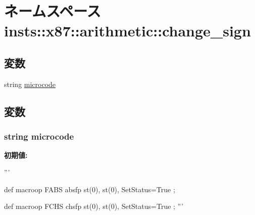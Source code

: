 \hypertarget{namespaceinsts_1_1x87_1_1arithmetic_1_1change__sign}{
\section{ネームスペース insts::x87::arithmetic::change\_\-sign}
\label{namespaceinsts_1_1x87_1_1arithmetic_1_1change__sign}
}
\subsection*{変数}
\begin{DoxyCompactItemize}
\item 
string \hyperlink{namespaceinsts_1_1x87_1_1arithmetic_1_1change__sign_a770f11a173e99389a8802f0107ed8f52}{microcode}
\end{DoxyCompactItemize}


\subsection{変数}
\hypertarget{namespaceinsts_1_1x87_1_1arithmetic_1_1change__sign_a770f11a173e99389a8802f0107ed8f52}{
\subsubsection[{microcode}]{\setlength{\rightskip}{0pt plus 5cm}string {\bf microcode}}}
\label{namespaceinsts_1_1x87_1_1arithmetic_1_1change__sign_a770f11a173e99389a8802f0107ed8f52}
{\bfseries 初期値:}
\begin{DoxyCode}
'''

def macroop FABS {
    absfp st(0), st(0), SetStatus=True
};

def macroop FCHS {
    chsfp st(0), st(0), SetStatus=True
};
'''
\end{DoxyCode}
